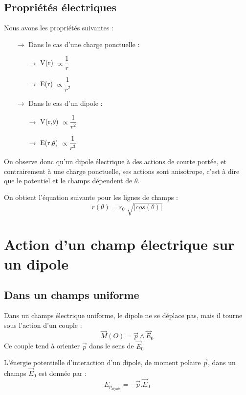 \subsection{Propriétés électriques}
Nous avons les propriétés suivantes :
\begin{itemize}
 \item[$\rightarrow$] Dans le cas d'une charge ponctuelle : 
\begin{itemize}
 \item[$\rightarrow$] V(r) $\propto \dfrac{1}{r}$
\item[$\rightarrow$] E(r) $\propto \dfrac{1}{r^2}$
\end{itemize}
 \item[$\rightarrow$] Dans le cas d'un dipole : 
\begin{itemize}
 \item[$\rightarrow$] V(r,$\theta$) $\propto \dfrac{1}{r^2}$
 \item[$\rightarrow$] E(r,$\theta$) $\propto \dfrac{1}{r^3}$
\end{itemize}
\end{itemize}
On observe donc qu'un dipole électrique à des actions de courte portée, et contrairement à une charge ponctuelle, ses actions sont anisotrope, c'est à dire que le potentiel et le champs dépendent de $\theta$.
\begin{prop}
On obtient l'équation suivante pour les lignes de champs : 
$$r(\theta) = r_0.\sqrt{|cos(\theta)|}$$ 
\end{prop}
\section{Action d'un champ électrique sur un dipole}
\subsection{Dans un champs uniforme}
\begin{prop}
Dans un champs électrique uniforme, le dipole ne se déplace pas, mais il tourne sous l'action d'un couple : $$\overrightarrow{M}(O) = \overrightarrow{p}\wedge\overrightarrow{E}_0$$
Ce couple tend à orienter $\overrightarrow{p}$ dans le sens de $\overrightarrow{E}_0$
\end{prop}
\begin{prop}
L'énergie potentielle d'interaction d'un dipole, de moment polaire $\overrightarrow{p}$, dans un champs $\overrightarrow{E}_0$ est donnée par : 
$$E_{p_{dipole}} = -\overrightarrow{p}.\overrightarrow{E}_0$$ 
\end{prop}
